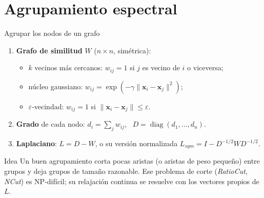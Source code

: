 \documentclass[aspectratio=169,11pt]{beamer}
\newcommand{\x}{\bm{x}}
\newcommand{\eps}{\varepsilon}
\begin{document}
\section{Agrupamiento espectral}

\begin{frame}{Agrupar los nodos de un grafo}
  \begin{enumerate}
    \item \textbf{Grafo de similitud} $W$ ($n \times n$, simétrica):
      \begin{itemize}
        \item $k$ vecinos más cercanos: $w_{ij} = 1$ si $j$ es vecino de $i$ o viceversa;
        \item núcleo gaussiano: $w_{ij} = \exp(-\gamma \|\x_i - \x_j\|^2)$;
        \item $\eps$-vecindad: $w_{ij} = 1$ si $\|\x_i - \x_j\| \le \eps$.
      \end{itemize}
    \item \textbf{Grado} de cada nodo: $d_i = \sum_j w_{ij}$, \ $D = \operatorname{diag}(d_1,\dots,d_n)$.
    \item \textbf{Laplaciano}: $L = D - W$, o su versión normalizada
          $L_{sym} = I - D^{-1/2} W D^{-1/2}$.
  \end{enumerate}
  \vspace{4pt}
  \begin{block}{Idea}
    Un buen agrupamiento corta pocas aristas (o aristas de peso pequeño) entre grupos y deja grupos
    de tamaño razonable. Ese problema de corte (\emph{RatioCut}, \emph{NCut}) es NP-difícil;
    su relajación continua se resuelve con los vectores propios de $L$.
  \end{block}
\end{frame}
\end{document}
